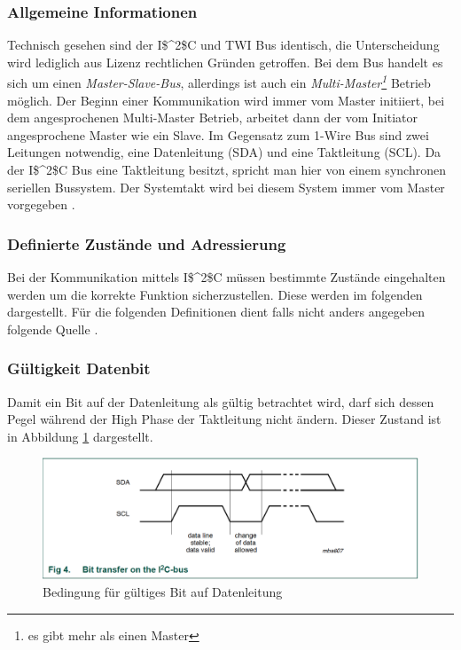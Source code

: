 \subsubsection{Allgemeine Informationen}
\label{subsubsection_Allgemeine_Informationen_I2C}
Technisch gesehen sind der \ac{I$^2$C} und \ac{TWI} Bus identisch, die Unterscheidung wird lediglich aus Lizenz rechtlichen Gründen getroffen. Bei dem Bus handelt es sich um einen \textit{Master-Slave-Bus}, allerdings ist auch ein \textit{Multi-Master\footnote{es gibt mehr als einen Master}} Betrieb möglich. Der Beginn einer Kommunikation wird immer vom Master initiiert, bei dem angesprochenen Multi-Master Betrieb, arbeitet dann der vom Initiator angesprochene Master wie ein Slave. Im Gegensatz zum 1-Wire Bus sind zwei Leitungen notwendig, eine Datenleitung (SDA) und eine Taktleitung (SCL). Da der \ac{I$^2$C} Bus eine Taktleitung besitzt, spricht man hier von einem synchronen seriellen Bussystem. Der Systemtakt wird bei diesem System immer vom Master vorgegeben \citep{Bussysteme_in_der_Praxis}. 

\subsubsection{Definierte Zustände und Adressierung}
\label{subsubsection_definierte_Zustände_Adressierung}
Bei der Kommunikation mittels \ac{I$^2$C} müssen bestimmte Zustände eingehalten werden um die korrekte Funktion sicherzustellen. Diese werden im folgenden dargestellt. Für die folgenden Definitionen dient falls nicht anders angegeben folgende Quelle \citep{I2C_Datenblatt}.
\subsubsection*{Gültigkeit Datenbit}
\label{subsubsection_Gültigkeit_Datenbit}
Damit ein Bit auf der Datenleitung als gültig betrachtet wird, darf sich dessen Pegel während der High Phase der Taktleitung nicht ändern. Dieser Zustand ist in Abbildung \ref{Abb_Bild_I2C_data_valid} dargestellt.

\begin{figure}[!h] 
  \centering
     \includegraphics[scale=.65]{BilderAllgemein/I2C_data_valid.png}
  \caption{Bedingung für gültiges Bit auf Datenleitung \citep[S. 9]{I2C_Datenblatt}}
  \label{Abb_Bild_I2C_data_valid}
\end{figure}

